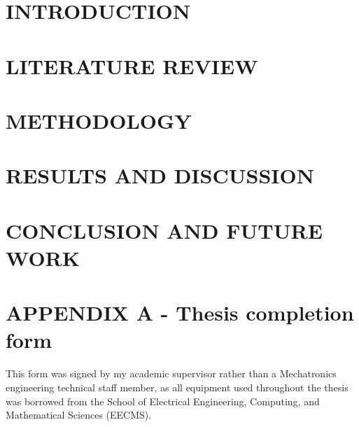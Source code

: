 \documentclass[12pt,twoside]{article}
\begin{document}

\thispagestyle{empty}\null\clearpage


\thispagestyle{empty}\null\clearpage


\cleardoublepage

\renewcommand{\contentsname}{TABLE OF CONTENTS}
\tableofcontents
\pagebreak
\listoffigures
\listoftables
\cleardoublepage
{}

\section{INTRODUCTION}

\cleardoublepage

\section{LITERATURE REVIEW}

\cleardoublepage

\section{METHODOLOGY}

\cleardoublepage

\section{RESULTS AND DISCUSSION}

\cleardoublepage

\section{CONCLUSION AND FUTURE WORK}

\cleardoublepage

\printbibliography[title={REFERENCES},heading=bibnumbered]
\cleardoublepage

\appendix

\section*{APPENDIX A - Thesis completion form}
This form was signed by my academic supervisor rather than a Mechatronics engineering technical staff member,
as all equipment used throughout the thesis was borrowed from the School of Electrical Engineering, Computing, and
Mathematical Sciences (EECMS).



\cleardoublepage

\cleardoublepage

\cleardoublepage

\end{document}
